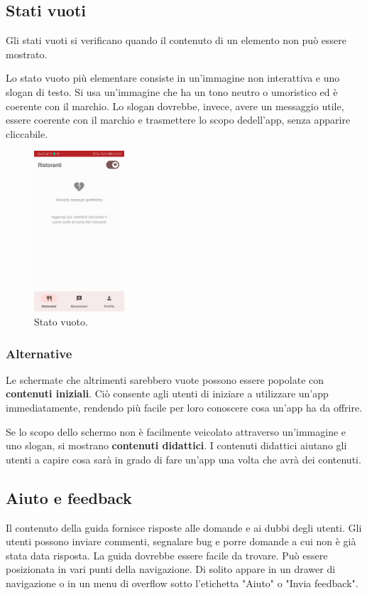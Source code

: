 \documentclass[12pt, a4paper]{report}
\begin{document}
	\subsection{Stati vuoti}
	Gli stati vuoti si verificano quando il contenuto di un elemento non può essere mostrato.

	Lo stato vuoto più elementare consiste in un'immagine non interattiva e uno slogan di testo. Si usa un'immagine che ha un tono neutro o umoristico ed è coerente con il marchio. Lo slogan dovrebbe, invece, avere un messaggio utile, essere coerente con il  marchio e trasmettere lo scopo dedell’app, senza apparire cliccabile.
	\begin{figure}[h]
		\centering
		\includegraphics[width=0.3\textwidth]{statoVuoto}
		\caption{Stato vuoto.}
	\end{figure}
	\subsubsection{Alternative}
	Le schermate che altrimenti sarebbero vuote possono essere popolate con \textbf{contenuti iniziali}. Ciò consente agli utenti di iniziare a utilizzare un'app immediatamente, rendendo più facile per loro conoscere cosa un'app ha da offrire.

	Se lo scopo dello schermo non è facilmente veicolato attraverso un'immagine e uno slogan, si mostrano \textbf{contenuti didattici}. I contenuti didattici aiutano gli utenti a capire cosa sarà in grado di fare un'app una volta che avrà dei contenuti.


	\subsection{Aiuto e feedback}
	Il contenuto della guida fornisce risposte alle domande e ai dubbi degli utenti. Gli utenti possono inviare commenti, segnalare bug e porre domande a cui non è già stata data risposta. La guida dovrebbe essere facile da trovare. Può essere posizionata in vari punti della navigazione.
	Di solito appare in un drawer di navigazione o in un menu di overflow sotto l'etichetta "Aiuto" o "Invia feedback".
\end{document}
